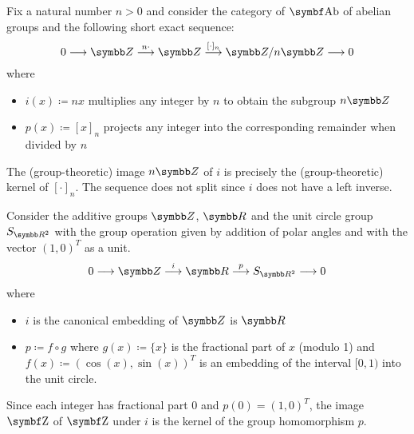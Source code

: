 \begin{example}\label{ex:short_exact_sequences}
  \mbox{}
  \begin{defenum}
     Fix a natural number \( n > 0 \) and consider the category of \( \Cat{Ab} \) of abelian groups and the following short exact sequence:
    \begin{equation*}
      0
      \longrightarrow
      \BZ
      \overset {n \cdot} \longrightarrow
      \BZ
      \overset {\lbrack \cdot \rbrack_n} \longrightarrow
      \BZ / n \BZ
      \longrightarrow
      0
    \end{equation*}
    where
    \begin{itemize}
      \item \( i(x) \coloneqq nx \) multiplies any integer by \( n \) to obtain the subgroup \( n \BZ \)
      \item \( p(x) \coloneqq [x]_n \) projects any integer into the corresponding remainder when divided by \( n \)
    \end{itemize}

    The (group-theoretic) image \( n \BZ \) of \( i \) is precisely the (group-theoretic) kernel of \( [\cdot]_n \). The sequence does not split since \( i \) does not have a left inverse.

     Consider the additive groups \( \BZ \), \( \BR \) and the unit circle group \( S_{\BR^2} \) with the group operation given by addition of polar angles and with the vector \( (1, 0)^T \) as a unit.
    \begin{equation*}
      0
      \longrightarrow
      \BZ
      \overset i \longrightarrow
      \BR
      \overset p \longrightarrow
      S_{\BR^2}
      \longrightarrow
      0
    \end{equation*}
    where
    \begin{itemize}
      \item \( i \) is the canonical embedding of \( \BZ \) is \( \BR \)
      \item \( p \coloneqq f \circ g \) where \( g(x) \coloneqq \{ x \} \) is the fractional part of \( x \) (modulo 1) and \( f(x) \coloneqq (\cos(x), \sin(x))^T \) is an embedding of the interval \( [0, 1) \) into the unit circle.
    \end{itemize}

    Since each integer has fractional part \( 0 \) and \( p(0) = (1, 0)^T \), the image \( \Bold Z \) of \( \Bold Z \) under \( i \) is the kernel of the group homomorphism \( p \).


\end{defenum}
\end{example}
